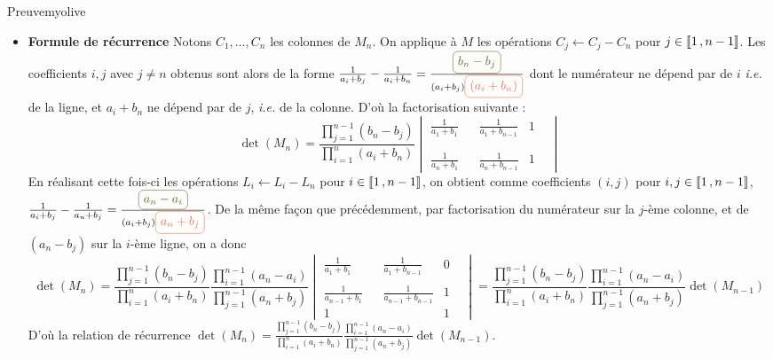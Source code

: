     \begin{demo}{Preuve}{myolive}
        \begin{itemize}
            \item \textbf{Formule de récurrence} \quad Notons $C_1,\ldots,C_n$ les colonnes de $M_n$. On applique à $M$ les opérations $C_j \leftarrow C_j - C_n$ pour $j \in \left\llbracket 1 \, , n-1 \right\rrbracket$. Les coefficients $i,j$ avec $j \neq n$ obtenus sont alors de la forme $\frac{1}{a_i + b_j} - \frac{1}{a_i + b_n} = \frac{\lilbox{myolive}{$b_n - b_j$}}{(a_i + b_j)\lilbox{myorange}{$(a_i + b_n)$}}$ dont le numérateur ne dépend par de $i$ \textit{i.e.} de la ligne, et $a_i + b_n$ ne dépend par de $j$, \textit{i.e.} de la colonne. D’où la factorisation suivante : 
            \[ \det(M_n) = \frac{\prod_{j=1}^{n-1} (b_n - b_j)}{\prod_{i=1}^n (a_i + b_n)} \begin{vmatrix}
                \frac{1}{a_1 + b_1} & & \frac{1}{a_{1} + b_{n-1}} & 1 \\
                 & & & & \\
                 & & & & \\
                \frac{1}{a_{n} + b_1} & & \frac{1}{a_{n} + b_{n-1}} & 1
            \end{vmatrix} \]    
            En réalisant cette fois-ci les opérations $L_i \leftarrow L_i - L_n$ pour $i \in \left\llbracket 1 \, , n-1 \right\rrbracket$, on obtient comme coefficients $(i,j)$ pour $i,j \in \left\llbracket 1 \, , n-1 \right\rrbracket$, $ \frac{1}{a_i + b_j} - \frac{1}{a_n + b_j} = \frac{\lilbox{myolive}{$a_n - a_i$}}{(a_i + b_j)\lilbox{myorange}{$a_n + b_j$}}$. De la même façon que précédemment, par factorisation du numérateur sur la $j$-ème colonne, et de $(a_n - b_j)$ sur la $i$-ème ligne, on a donc 
            \[ \det(M_n) = \frac{\prod_{j=1}^{n-1} (b_n - b_j)}{\prod_{i=1}^n (a_i + b_n)} \frac{\prod_{i=1}^{n-1} (a_n - a_i)}{\prod_{j = 1}^{n-1} (a_n + b_j)} \begin{vmatrix}
                \frac{1}{a_1 + b_1} & & \frac{1}{a_{1} + b_{n-1}} & 0 \\
                 & & & & \\
                \frac{1}{a_{n-1} + b_1} & & \frac{1}{a_{n-1} + b_{n-1}} & 1 \\
                1 & & & 1 
            \end{vmatrix} = \frac{\prod_{j=1}^{n-1} (b_n - b_j)}{\prod_{i=1}^n (a_i + b_n)} \frac{\prod_{i=1}^{n-1} (a_n - a_i)}{\prod_{j = 1}^{n-1} (a_n + b_j)} \det(M_{n-1}) \]
            D’où la relation de récurrence $\det(M_{n}) = \frac{\prod_{j=1}^{n-1} (b_n - b_j)}{\prod_{i=1}^n (a_i + b_n)} \frac{\prod_{i=1}^{n-1} (a_n - a_i)}{\prod_{j = 1}^{n-1} (a_n + b_j)} \det(M_{n-1})$.

\end{itemize}
\end{demo}
